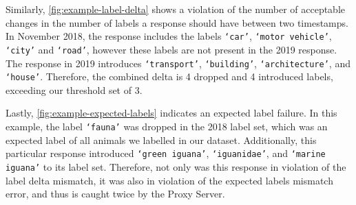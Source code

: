 Similarly, \cref{fig:example-label-delta} shows a violation of the number of acceptable changes in the number of labels a response should have between two timestamps. In November 2018, the response includes the labels \texttt{`car'}, \texttt{`motor vehicle'}, \texttt{`city'} and \texttt{`road'}, however these labels are not present in the 2019 response. The response in 2019 introduces \texttt{`transport'}, \texttt{`building'}, \texttt{`architecture'}, and \texttt{`house'}. Therefore, the combined delta is 4 dropped and 4 introduced labels, exceeding our threshold set of 3.

Lastly, \cref{fig:example-expected-labels} indicates an expected label failure. In this example, the label \texttt{`fauna'} was dropped in the 2018 label set, which was an expected label of all animals we labelled in our dataset. Additionally, this particular response introduced  \texttt{`green iguana'}, \texttt{`iguanidae'}, and \texttt{`marine iguana'} to its label set. Therefore, not only was this response in violation of the label delta mismatch, it was also in violation of the expected labels mismatch error, and thus is caught twice by the Proxy Server.




